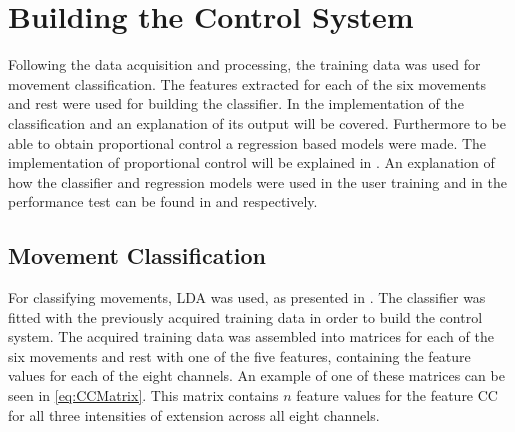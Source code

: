 \section{Building the Control System}

Following the data acquisition and processing, the training data was used for movement classification. The features extracted for each of the six movements and rest were used for building the classifier. In  the implementation of the classification and an explanation of its output will be covered. Furthermore to be able to obtain proportional control a regression based models were made. The implementation of proportional control will be explained in . An explanation of how the classifier and regression models were used in the user training and in the performance test can be found in  and  respectively.  


\subsection{Movement Classification} \label{sub:M:classification}

For classifying movements, LDA was used, as presented in . The classifier was fitted with the previously acquired training data in order to build the control system.  
The acquired training data was assembled into matrices for each of the six movements and rest with one of the five features, containing the feature values for each of the eight channels. An example of one of these matrices can be seen in \eqref{eq:CCMatrix}. This matrix contains $n$ feature values for the feature CC for all three intensities of extension across all eight channels.  

